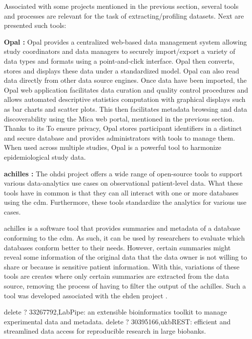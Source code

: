 Associated with some projects mentioned in the previous section, several tools and
processes are relevant for the task of extracting/profiling datasets.
Next are presented such tools:

\textbf{Opal \cite{mica}:}
Opal provides a centralized web-based data management system allowing study
coordinators and data managers to securely import/export a variety of data types and
formats using a point-and-click interface.
Opal then converts, stores and displays these data under a standardized model.  Opal
can also read data directly from other data source engines.
Once data have been imported, the Opal web application facilitates data curation and
quality control procedures and allows automated descriptive statistics computation with
graphical displays such as bar charts and scatter plots.
This then facilitates metadata browsing and data discoverability using the Mica web
portal, mentioned in the previous section.
Thanks to its To ensure privacy, Opal stores participant identifiers in a distinct and
secure database and provides administrators with tools to manage them.
When used across multiple studies, Opal is a powerful tool to harmonize epidemiological
study data.

\textbf{\gls{achilles} \cite{achilles-github}:}
The \gls{ohdsi} project offers a wide range of open-source tools\cite{ohdsi-tools} to support various data-analytics use cases on observational patient-level data.
What these tools have in common is that they can all interact with one or more
databases using the \gls{cdm}.
Furthermore, these tools standardize the analytics for various use cases.

\gls{achilles} is a software tool that provides summaries and metadata of a database
conforming to the \gls{cdm}.
As such, it can be used by researchers to evaluate which databases conform better to
their needs.
However, certain summaries might reveal some information of the original data that the
data owner is not willing to share or because is sensitive patient information.
With this, variations of these tools are creates where only certain summaries are
extracted from the data source, removing the process of having to filter the output of
the \gls{achilles}.
Such a tool was developed associated with the \gls{ehden} project \cite{peters-tool}.

%
%
delete ? 33267792,LabPipe: an extensible bioinformatics toolkit to manage experimental data and metadata.
%
delete ? 30395166,ukbREST: efficient and streamlined data access for reproducible research in large biobanks.
%
%
%
%
%
%
%

